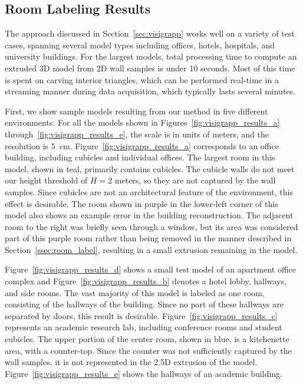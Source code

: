 \documentclass[12pt,onecolumn,oneside]{book}
\begin{document}
\FloatBarrier
\subsection{Room Labeling Results}
\label{ssec:visigrapp_results}

The approach discussed in Section~\ref{sec:visigrapp} works well on a variety of test cases, spanning several model types including offices, hotels, hospitals, and university buildings.  For the largest models, total processing time to compute an extruded 3D model from 2D wall samples is under 10 seconds.  Most of this time is spent on carving interior triangles, which can be performed real-time in a streaming manner during data acquisition, which typically lasts several minutes.

First, we show sample models resulting from our method in five different environments.  For all the models shown in Figures~\ref{fig:visigrapp_results_a} through~\ref{fig:visigrapp_results_e}, the scale is in units of meters, and the resolution is $5$~cm.  Figure~\ref{fig:visigrapp_results_a} corresponds to an office building, including cubicles and individual offices.  The largest room in this model, shown in teal, primarily contains cubicles.  The cubicle walls do not meet our height threshold of $H=2$ meters, so they are not captured by the wall samples.  Since cubicles are not an architectural feature of the environment, this effect is desirable.  The room shown in purple in the lower-left corner of this model also shows an example error in the building reconstruction.  The adjacent room to the right was briefly seen through a window, but its area was considered part of this purple room rather than being removed in the manner described in Section~\ref{ssec:room_label}, resulting in a small extrusion remaining in the model.

Figure~\ref{fig:visigrapp_results_d} shows a small test model of an apartment office complex and Figure~\ref{fig:visigrapp_results_b} denotes a hotel lobby, hallways, and side rooms.  The vast majority of this model is labeled as one room, consisting of the hallways of the building.  Since no part of these hallways are separated by doors, this result is desirable.  Figure~\ref{fig:visigrapp_results_c} represents an academic research lab, including conference rooms and student cubicles.  The upper portion of the center room, shown in blue, is a kitchenette area, with a counter-top.  Since the counter was not sufficiently captured by the wall samples, it is not represented in the 2.5D extrusion of the model. Figure~\ref{fig:visigrapp_results_e} shows the hallways of an academic building.
\end{document}

